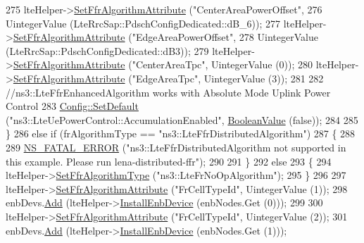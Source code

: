 \begin{DoxyCode}
275       lteHelper->\hyperlink{classns3_1_1LteHelper_a793d56e843a844428851e90752c5f130}{SetFfrAlgorithmAttribute} (\textcolor{stringliteral}{"CenterAreaPowerOffset"},
276                                            UintegerValue (LteRrcSap::PdschConfigDedicated::dB\_6));
277       lteHelper->\hyperlink{classns3_1_1LteHelper_a793d56e843a844428851e90752c5f130}{SetFfrAlgorithmAttribute} (\textcolor{stringliteral}{"EdgeAreaPowerOffset"},
278                                            UintegerValue (LteRrcSap::PdschConfigDedicated::dB3));
279       lteHelper->\hyperlink{classns3_1_1LteHelper_a793d56e843a844428851e90752c5f130}{SetFfrAlgorithmAttribute} (\textcolor{stringliteral}{"CenterAreaTpc"}, UintegerValue (0));
280       lteHelper->\hyperlink{classns3_1_1LteHelper_a793d56e843a844428851e90752c5f130}{SetFfrAlgorithmAttribute} (\textcolor{stringliteral}{"EdgeAreaTpc"}, UintegerValue (3));
281 
282       \textcolor{comment}{//ns3::LteFfrEnhancedAlgorithm works with Absolute Mode Uplink Power Control}
283       \hyperlink{group__config_ga2e7882df849d8ba4aaad31c934c40c06}{Config::SetDefault} (\textcolor{stringliteral}{"ns3::LteUePowerControl::AccumulationEnabled"}, 
      \hyperlink{classns3_1_1BooleanValue}{BooleanValue} (\textcolor{keyword}{false}));
284 
285     \}
286   \textcolor{keywordflow}{else} \textcolor{keywordflow}{if} (frAlgorithmType == \textcolor{stringliteral}{"ns3::LteFfrDistributedAlgorithm"})
287     \{
288 
289       \hyperlink{group__fatal_ga5131d5e3f75d7d4cbfd706ac456fdc85}{NS\_FATAL\_ERROR} (\textcolor{stringliteral}{"ns3::LteFfrDistributedAlgorithm not supported in this example. Please
       run lena-distributed-ffr"});
290 
291     \}
292   \textcolor{keywordflow}{else}
293     \{
294       lteHelper->\hyperlink{classns3_1_1LteHelper_a035c6b03305c1511975362f80425b5fc}{SetFfrAlgorithmType} (\textcolor{stringliteral}{"ns3::LteFrNoOpAlgorithm"});
295     \}
296 
297   lteHelper->\hyperlink{classns3_1_1LteHelper_a793d56e843a844428851e90752c5f130}{SetFfrAlgorithmAttribute} (\textcolor{stringliteral}{"FrCellTypeId"}, UintegerValue (1));
298   enbDevs.\hyperlink{classns3_1_1NetDeviceContainer_a7ca8bc1d7ec00fd4fcc63869987fbda5}{Add} (lteHelper->\hyperlink{classns3_1_1LteHelper_a5e009ad35ef85f46b5a6099263f15a03}{InstallEnbDevice} (enbNodes.Get (0)));
299 
300   lteHelper->\hyperlink{classns3_1_1LteHelper_a793d56e843a844428851e90752c5f130}{SetFfrAlgorithmAttribute} (\textcolor{stringliteral}{"FrCellTypeId"}, UintegerValue (2));
301   enbDevs.\hyperlink{classns3_1_1NetDeviceContainer_a7ca8bc1d7ec00fd4fcc63869987fbda5}{Add} (lteHelper->\hyperlink{classns3_1_1LteHelper_a5e009ad35ef85f46b5a6099263f15a03}{InstallEnbDevice} (enbNodes.Get (1)));

\end{DoxyCode}
